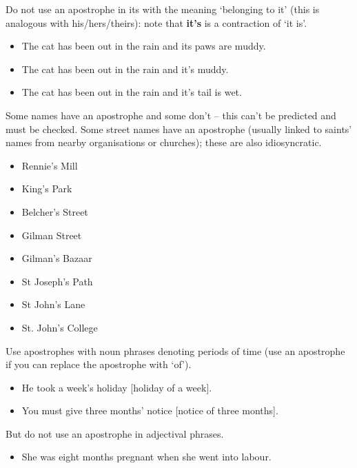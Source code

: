 \documentclass[11pt,a4paper]{book}
\newcommand{\xmark}{{\color{cadmiumred}\ding{54}}}%
\newcommand{\cmark}{{\color{green(html/cssgreen)}\checkmark}}%
\begin{document}
			Do not use an apostrophe in its with the meaning `belonging to it' (this is analogous with his/hers/theirs): note that \textbf{it's} is a contraction of `it is'.
			{\firasans \begin{mdframed}[backgroundcolor=aliceblue] \begin{itemize}[label=\cmark]
				\item The cat has been out in the rain and its paws are muddy.
				\item The cat has been out in the rain and it's muddy.
				\item[\xmark] The cat has been out in the rain and it's tail is wet.
			\end{itemize} \end{mdframed} }
			Some names have an apostrophe and some don't -- this can't be predicted and must be checked. Some street names have an apostrophe (usually linked to saints' names from nearby organisations or churches); these are also idiosyncratic.
			{\firasans \begin{mdframed}[backgroundcolor=aliceblue] \begin{itemize}[label=\cmark]
				\item Rennie's Mill
				\item King's Park
				\item Belcher's Street
				\item Gilman Street
				\item Gilman's Bazaar
				\item St Joseph's Path
				\item St John's Lane
				\item St. John's College
			\end{itemize} \end{mdframed} }
			Use apostrophes with noun phrases denoting periods of time (use an apostrophe if you can replace the apostrophe with `of').
			{\firasans \begin{mdframed}[backgroundcolor=aliceblue] \begin{itemize}[label=\cmark]
				\item He took a week's holiday [holiday of a week].
				\item You must give three months' notice [notice of three months].
			\end{itemize} \end{mdframed} }
			But do not use an apostrophe in adjectival phrases.
			{\firasans \begin{mdframed}[backgroundcolor=aliceblue] \begin{itemize}[label=\cmark]
				\item She was eight months pregnant when she went into labour.
			\end{itemize} \end{mdframed} }
		\newpage
\end{document}
